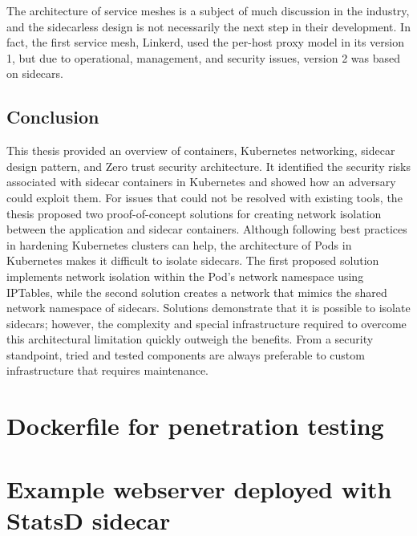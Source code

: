\documentclass[english, 12pt, a4paper, sci, utf8, a-2b, online]{aaltothesis}
\begin{document}
The architecture of service meshes is a subject of much discussion in the industry, and the sidecarless design is not necessarily the next step in their development.
In fact, the first service mesh, Linkerd, used the per-host proxy model in its version 1, but due to operational, management, and security issues, version 2 was based on sidecars.

\subsection{Conclusion}

This thesis provided an overview of containers, Kubernetes networking, sidecar design pattern, and Zero trust security architecture.
It identified the security risks associated with sidecar containers in Kubernetes and showed how an adversary could exploit them.
For issues that could not be resolved with existing tools, the thesis proposed two proof-of-concept solutions for creating network isolation between the application and sidecar containers.
Although following best practices in hardening Kubernetes clusters can help, the architecture of Pods in Kubernetes makes it difficult to isolate sidecars.
The first proposed solution implements network isolation within the Pod's network namespace using IPTables, while the second solution creates a network that mimics the shared network namespace of sidecars.
Solutions demonstrate that it is possible to isolate sidecars; however, the complexity and special infrastructure required to overcome this architectural limitation quickly outweigh the benefits.
From a security standpoint, tried and tested components are always preferable to custom infrastructure that requires maintenance.

\clearpage

\thesisbibliography
\printbibliography

\clearpage


\thesisappendix

\section{Dockerfile for penetration testing} \label{app:malicious-sidecar}



\clearpage

\section{Example webserver deployed with StatsD sidecar} \label{app:node-webapp}
\end{document}
